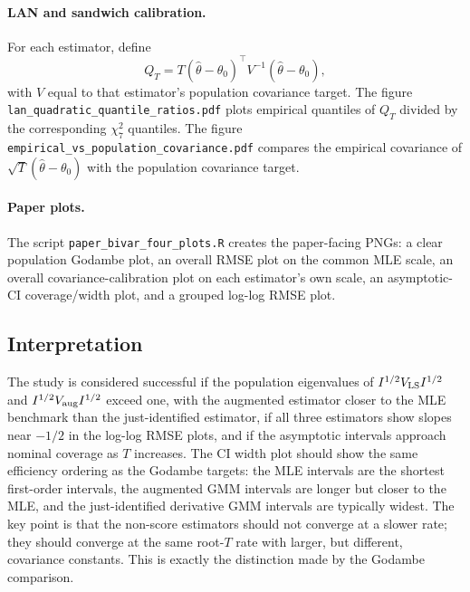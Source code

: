 \paragraph{LAN and sandwich calibration.}
For each estimator, define
\[
    Q_T
    =
    T(\hat\theta-\theta_0)^\top V^{-1}(\hat\theta-\theta_0),
\]
with $V$ equal to that estimator's population covariance target.  The figure \texttt{lan\_quadratic\_quantile\_ratios.pdf} plots empirical quantiles of $Q_T$ divided by the corresponding $\chi^2_7$ quantiles.  The figure \texttt{empirical\_vs\_population\_covariance.pdf} compares the empirical covariance of $\sqrt{T}(\hat\theta-\theta_0)$ with the population covariance target.


\paragraph{Paper plots.}
The script \texttt{paper\_bivar\_four\_plots.R} creates the paper-facing PNGs: a clear population Godambe plot, an overall RMSE plot on the common MLE scale, an overall covariance-calibration plot on each estimator's own scale, an asymptotic-CI coverage/width plot, and a grouped log-log RMSE plot.

\subsection{Interpretation}

The study is considered successful if the population eigenvalues of $I^{1/2}V_{\rm LS}I^{1/2}$ and $I^{1/2}V_{\rm aug}I^{1/2}$ exceed one, with the augmented estimator closer to the MLE benchmark than the just-identified estimator, if all three estimators show slopes near $-1/2$ in the log-log RMSE plots, and if the asymptotic intervals approach nominal coverage as $T$ increases.  The CI width plot should show the same efficiency ordering as the Godambe targets: the MLE intervals are the shortest first-order intervals, the augmented GMM intervals are longer but closer to the MLE, and the just-identified derivative GMM intervals are typically widest.  The key point is that the non-score estimators should not converge at a slower rate; they should converge at the same root-$T$ rate with larger, but different, covariance constants.  This is exactly the distinction made by the Godambe comparison.
